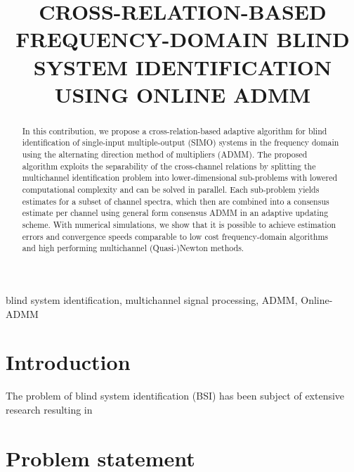 \documentclass{article}
\title{CROSS-RELATION-BASED FREQUENCY-DOMAIN BLIND SYSTEM IDENTIFICATION USING ONLINE ADMM}
\begin{document}
%
\maketitle
%
\begin{abstract}
    In this contribution, we propose a cross-relation-based adaptive algorithm for blind identification of single-input multiple-output (SIMO) systems in the frequency domain using the alternating direction method of multipliers (ADMM).
    The proposed algorithm exploits the separability of the cross-channel relations by splitting the multichannel identification problem into lower-dimensional sub-problems with lowered computational complexity and can be solved in parallel.
    Each sub-problem yields estimates for a subset of channel spectra, which then are combined into a consensus estimate per channel using general form consensus ADMM in an adaptive updating scheme.
    With numerical simulations, we show that it is possible to achieve estimation errors and convergence speeds comparable to low cost frequency-domain algorithms and high performing multichannel (Quasi-)Newton methods.
\end{abstract}
%
\begin{keywords}
    blind system identification, multichannel signal processing, ADMM, Online-ADMM
\end{keywords}
%
\section{Introduction}
\label{sec:intro}
The problem of blind system identification (BSI) has been subject of extensive research resulting in 


\section{Problem statement}
\label{sec:problem_statement}


\end{document}
